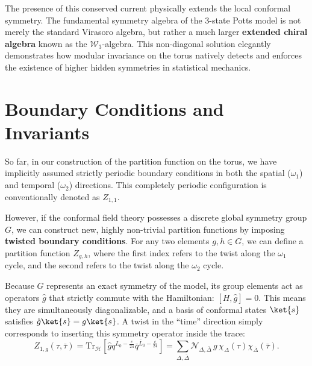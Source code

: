 The presence of this conserved current physically extends the local conformal symmetry. The fundamental symmetry algebra of the 3-state Potts model is not merely the standard Virasoro algebra, but rather a much larger \textbf{extended chiral algebra} known as the $\mathcal{W}_3$-algebra. This non-diagonal solution elegantly demonstrates how modular invariance on the torus natively detects and enforces the existence of higher hidden symmetries in statistical mechanics.

\section{Boundary Conditions and Invariants}

So far, in our construction of the partition function on the torus, we have implicitly assumed strictly periodic boundary conditions in both the spatial (\(\omega_1\)) and temporal (\(\omega_2\)) directions. This completely periodic configuration is conventionally denoted as \(Z_{1,1}\).

However, if the conformal field theory possesses a discrete global symmetry group \(G\), we can construct new, highly non-trivial partition functions by imposing \textbf{twisted boundary conditions}. For any two elements \(g, h \in G\), we can define a partition function \(Z_{g,h}\), where the first index refers to the twist along the \(\omega_1\) cycle, and the second refers to the twist along the \(\omega_2\) cycle.

Because \(G\) represents an exact symmetry of the model, its group elements act as operators \(\hat{g}\) that strictly commute with the Hamiltonian: \([H, \hat{g}] = 0\). This means they are simultaneously diagonalizable, and a basis of conformal states \(\ket{s}\) satisfies \(\hat{g}\ket{s} = g\ket{s}\). A twist in the ``time'' direction simply corresponds to inserting this symmetry operator inside the trace:
\[
    Z_{1,g}(\tau, \bar{\tau}) = \mathrm{Tr}_{\mathcal{H}} \left[ \hat{g} q^{L_0 - \frac{c}{24}} \bar{q}^{\bar{L}_0 - \frac{c}{24}} \right] = \sum_{\Delta, \bar{\Delta}} \mathcal{N}_{\Delta, \bar{\Delta}} \, g \, \chi_{\Delta}(\tau) \chi_{\bar{\Delta}}(\bar{\tau}).
\]

